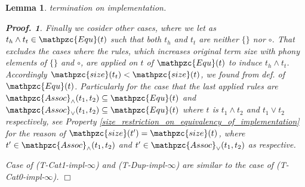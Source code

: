 \documentclass[12pt]{article}
\newtheorem{Lemma}{Lemma}[section]
\newtheorem{Proof}{Proof.}
\begin{document}
\begin{Lemma}{termination on implementation.}
\begin{Proof}
    Finally we cosider other cases, where we let as
    $t_h \wedge t_t\in \mathpzc{Equ}(t)$ such that
    both $t_h$ and $t_t$ are neither $\{\}$ nor $\circ$.
    That excludes the cases where the rules, which increases original term
    size with phony elements of $\{\}$ and $\circ$, are applied on $t$ of
    $\mathpzc{Equ}(t)$ to induce $t_h \wedge t_t$.
    Accordingly $\mathpzc{size}(t_t) < \mathpzc{size}(t)$, we found from
    def. of $\mathpzc{Equ}(t)$. Particularly for the case that the last
    applied rules are
    $\mathpzc{Assoc}_\wedge(t_1, t_2) \subseteq \mathpzc{Equ}(t)$ and
    $\mathpzc{Assoc}_\vee(t_1, t_2) \subseteq \mathpzc{Equ}(t)$ where $t$ is
    $t_1 \wedge t_2$ and $t_1 \vee t_2$ respectively, see Property
    \ref{size_restriction_on_equivalency_of_implementation} for the reason   
    of $\mathpzc{size}(t') = \mathpzc{size}(t)$, where
    $t' \in \mathpzc{Assoc}_\wedge(t_1, t_2)$ and
    $t' \in \mathpzc{Assoc}_\vee(t_1, t_2)$ as respective.
    
    Case of (T-Cat1-impl-$\infty$) and (T-Dup-impl-$\infty$) are
    similar to the case of (T-Cat0-impl-$\infty$).
    $\Box$
  \end{Proof}
\end{Lemma}
\end{document}
